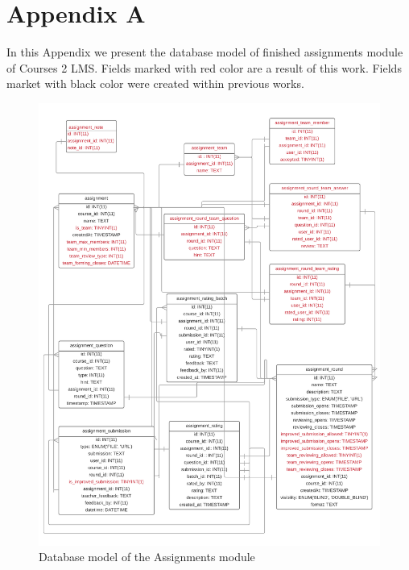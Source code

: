 
\chapter{Appendix A}

In this Appendix we present the database model of finished assignments module of Courses 2 LMS. Fields marked with red color are a result of this work. Fields market with black color were created within previous works.

\begin{figure}[h]
    \centering
    \includegraphics[width=\textwidth]{images/database.png}
    \caption*{Database model of the Assignments module}
\end{figure}
